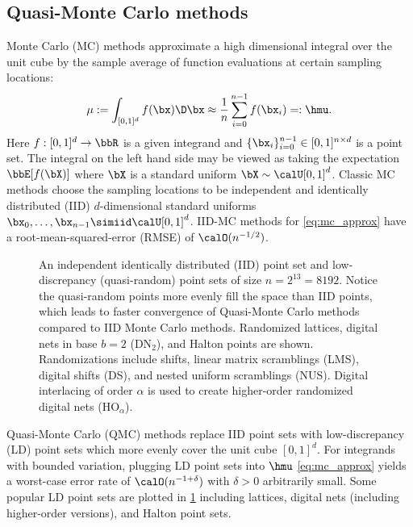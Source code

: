 \documentclass[acmsmall]{acmart}
\begin{document}
\subsection{Quasi-Monte Carlo methods}

Monte Carlo (MC) methods approximate a high dimensional integral over the unit cube by the sample average of function evaluations at certain sampling locations:
\begin{equation}
    \mu := \int_{[0,1]^d} f(\bx) \D \bx \approx \frac{1}{n} \sum_{i=0}^{n-1} f(\bx_i) =: \hmu.
    \label{eq:mc_approx}
\end{equation}
Here $f: [0,1]^d \to \bbR$ is a given integrand and $\{\bx_i\}_{i=0}^{n-1} \in [0,1]^{n \times d}$ is a point set. The integral on the left hand side may be viewed as taking the expectation $\bbE[f(\bX)]$ where $\bX$ is a standard uniform $\bX \sim \calU[0,1]^d$. Classic MC methods choose the sampling locations to be independent and identically distributed (IID) $d$-dimensional standard uniforms $\bx_0,\dots,\bx_{n-1} \simiid \calU[0,1]^d$. IID-MC methods for \eqref{eq:mc_approx} have a root-mean-squared-error (RMSE) of $\calO(n^{-1/2})$.

\begin{figure}%
    \centering
    \caption{An independent identically distributed (IID) point set and low-discrepancy (quasi-random) point sets of size $n=2^{13}=8192$. Notice the quasi-random points more evenly fill the space than IID points, which leads to faster convergence of Quasi-Monte Carlo methods compared to IID Monte Carlo methods. Randomized lattices, digital nets in base $b=2$ (DN${}_{2}$), and Halton points are shown. Randomizations include shifts, linear matrix scramblings (LMS), digital shifts (DS), and nested uniform scramblings (NUS). Digital interlacing of order $\alpha$ is used to create higher-order randomized digital nets (HO${}_\alpha$).}
    \Description[]{}
    \label{fig:point sets}
\end{figure}

Quasi-Monte Carlo (QMC) methods \citep{niederreiter.qmc_book,dick.digital_nets_sequences_book,kroese.handbook_mc_methods,dick2022lattice,lemieux2009monte,sloan1994lattice} replace IID point sets with low-discrepancy (LD) point sets which more evenly cover the unit cube $[0,1]^d$. For integrands with bounded variation, plugging LD point sets into $\hmu$ \eqref{eq:mc_approx} yields a worst-case error rate of $\calO(n^{-1+\delta})$ with $\delta>0$ arbitrarily small. Some popular LD point sets are plotted in \cref{fig:point sets} including lattices, digital nets (including higher-order versions), and Halton point sets.
\end{document}
